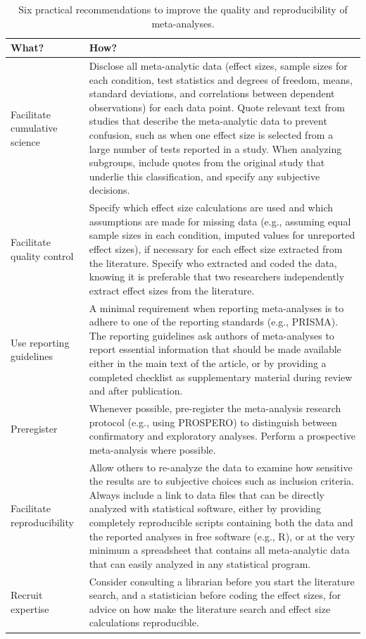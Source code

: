 \documentclass[
  oneside]{book}
\begin{document}
\begin{table}

\caption{\label{tab:table-rec1}Six practical recommendations to improve the quality and reproducibility of meta-analyses.}
\centering
\begin{tabular}[t]{l|l}
\hline
What? & How?\\
\hline
Facilitate cumulative science & Disclose all meta-analytic data (effect sizes, sample sizes for each condition, test statistics and degrees of freedom, means, standard deviations, and correlations between dependent observations) for each data point. Quote relevant text from studies that describe the meta-analytic data to prevent confusion, such as when one effect size is selected from a large number of tests reported in a study. When analyzing subgroups, include quotes from the original study that underlie this classification, and specify any subjective decisions.\\
\hline
Facilitate quality control & Specify which effect size calculations are used and which assumptions are made for missing data (e.g., assuming equal sample sizes in each condition, imputed values for unreported effect sizes), if necessary for each effect size extracted from the literature. Specify who extracted and coded the data, knowing it is preferable that two researchers independently extract effect sizes from the literature.\\
\hline
Use reporting guidelines & A minimal requirement when reporting meta-analyses is to adhere to one of the reporting standards (e.g., PRISMA). The reporting guidelines ask authors of meta-analyses to report essential information that should be made available either in the main text of the article, or by providing a completed checklist as supplementary material during review and after publication.\\
\hline
Preregister & Whenever possible, pre-register the meta-analysis research protocol (e.g., using PROSPERO) to distinguish between confirmatory and exploratory analyses. Perform a prospective meta-analysis where possible.\\
\hline
Facilitate reproducibility & Allow others to re-analyze the data to examine how sensitive the results are to subjective choices such as inclusion criteria. Always include a link to data files that can be directly analyzed with statistical software, either by providing completely reproducible scripts containing both the data and the reported analyses in free software (e.g., R), or at the very minimum a spreadsheet that contains all meta-analytic data that can easily analyzed in any statistical program.\\
\hline
Recruit expertise & Consider consulting a librarian before you start the literature search, and a statistician before coding the effect sizes, for advice on how make the literature search and effect size calculations reproducible.\\
\hline
\end{tabular}
\end{table}
\end{document}
